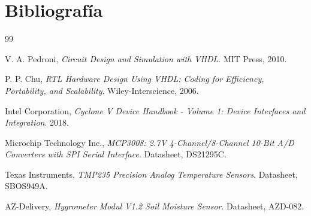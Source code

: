 \newpage
\section*{Bibliografía}

\begin{thebibliography}{99}
	
	V. A. Pedroni, \textit{Circuit Design and Simulation with VHDL}. MIT Press, 2010.
	
	P. P. Chu, \textit{RTL Hardware Design Using VHDL: Coding for Efficiency, Portability, and Scalability}. Wiley-Interscience, 2006.
	
	Intel Corporation, \textit{Cyclone V Device Handbook - Volume 1: Device Interfaces and Integration}. 2018.
	
	Microchip Technology Inc., \textit{MCP3008: 2.7V 4-Channel/8-Channel 10-Bit A/D Converters with SPI Serial Interface}. Datasheet, DS21295C.
	
	Texas Instruments, \textit{TMP235 Precision Analog Temperature Sensors}. Datasheet, SBOS949A.
	
	AZ-Delivery, \textit{Hygrometer Modul V1.2 Soil Moisture Sensor}. Datasheet, AZD-082.
	
\end{thebibliography}